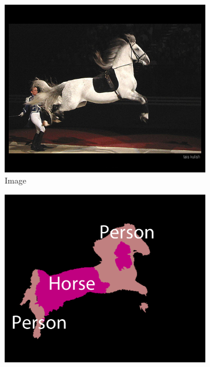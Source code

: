 \documentclass{article} %
\begin{document}
\begin{figure}[b]
  \begin{subfigure}[b]{0.15\linewidth}
    \includegraphics[width=\textwidth]{figs/ab/img/2008_004687}
    \captionsetup{labelformat=empty}
    \vspace{-0.2in}
    \caption{Image}
  \end{subfigure}
  \begin{subfigure}[b]{0.15\linewidth}
    \includegraphics[width=\textwidth]{figs/ab/crf/2008_004687}
    \captionsetup{labelformat=empty}
    \vspace{-0.2in}

\end{subfigure}
\end{figure}
\end{document}
